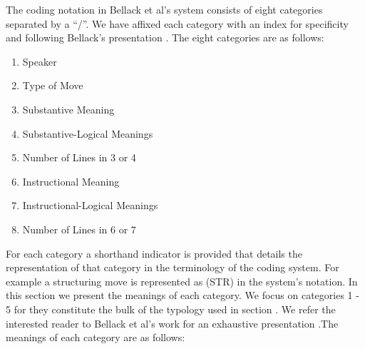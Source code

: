 \documentclass[conference]{IEEEtran}
\begin{document}
The coding notation in Bellack et al's system consists of eight categories
separated by a ``/''. We have affixed each category with an index for
specificity and following Bellack's presentation . The eight categories are as
follows:

\begin{enumerate}
  \item Speaker
  \item Type of Move
  \item Substantive Meaning
  \item Substantive-Logical Meanings
  \item Number of Lines in 3 or 4
  \item Instructional Meaning
  \item Instructional-Logical Meanings
  \item Number of Lines in 6 or 7
\end{enumerate}

For each category a shorthand indicator is provided that details the
representation of that category in the terminology of the coding system.
For example a structuring move is represented as (STR) in the system's
notation. In this section we present the meanings of each category. We focus on
categories 1 - 5 for they constitute the bulk of the typology used in section
. We refer the interested reader to Bellack et al's work for an
exhaustive presentation \cite{bellack1966language}.The meanings of each category are as follows:
\end{document}
